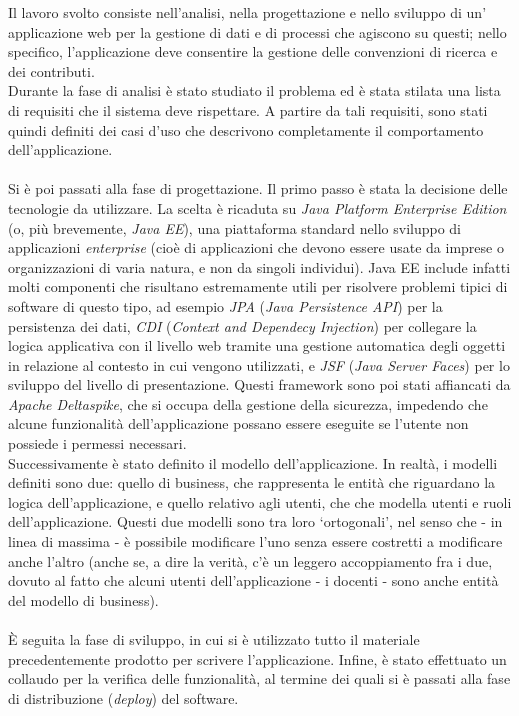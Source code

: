 Il lavoro svolto consiste nell'analisi, nella progettazione e nello sviluppo di un' applicazione web per la gestione di dati e di processi che agiscono su questi; nello specifico, l'applicazione deve consentire la gestione delle convenzioni di ricerca e dei contributi.\\
Durante la fase di analisi è stato studiato il problema ed è stata stilata una lista di requisiti che il sistema deve rispettare.
A partire da tali requisiti, sono stati quindi definiti dei casi d'uso che descrivono completamente il comportamento dell'applicazione.\\\\
Si è poi passati alla fase di progettazione. Il primo passo è stata la decisione delle tecnologie da utilizzare. La scelta è ricaduta su \textsl{Java Platform Enterprise Edition} (o, più brevemente, \textsl{Java EE}),
una piattaforma standard nello sviluppo di applicazioni \textit{enterprise} (cioè di applicazioni che devono essere usate da imprese o organizzazioni di varia natura, e non da singoli individui).
Java EE include infatti molti componenti che risultano estremamente utili per risolvere problemi tipici di software di questo tipo, ad esempio \textsl{JPA} (\textsl{Java Persistence API}) per la persistenza dei dati,
\textsl{CDI} (\textsl{Context and Dependecy Injection}) per collegare la logica applicativa con il livello web tramite una gestione automatica degli oggetti in relazione al contesto in cui vengono utilizzati, e \textsl{JSF} 
(\textsl{Java Server Faces}) per lo sviluppo del livello di presentazione. Questi framework sono poi stati affiancati da \textsl{Apache 
Deltaspike}, che si occupa della gestione della sicurezza, impedendo che alcune funzionalità dell'applicazione  possano essere eseguite se l'utente non possiede i permessi necessari.\\
Successivamente è stato definito il modello dell'applicazione. In realtà, i modelli definiti sono due: quello di business, che rappresenta le entità che riguardano la logica dell'applicazione, e quello relativo agli utenti,
che che modella utenti e ruoli dell'applicazione. Questi due modelli sono tra loro \textquoteleft ortogonali\textquoteright{}, nel senso che - in linea di massima - è possibile modificare l'uno senza essere costretti a modificare anche l'altro (anche se, a dire la verità, c'è un leggero accoppiamento fra i due, dovuto al fatto che alcuni utenti dell'applicazione - i docenti - sono anche entità del modello di business).\\
\\
È seguita la fase di sviluppo, in cui si è utilizzato tutto il materiale precedentemente prodotto per scrivere l'applicazione. Infine, è stato effettuato un collaudo per la verifica delle funzionalità, al termine dei quali si è passati alla fase di distribuzione (\textit{deploy}) del software.\\
\\
